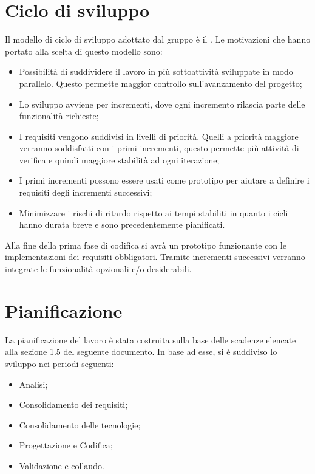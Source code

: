 \documentclass[../PianodiProgetto.tex]{subfiles}
\begin{document}
	
	\chapter{Ciclo di sviluppo}
	
	Il modello di ciclo di sviluppo adottato dal gruppo è il . Le motivazioni che hanno portato alla scelta di questo modello sono:
	\begin{itemize}
		\item Possibilità di suddividere il lavoro in più sottoattività sviluppate in modo parallelo. Questo permette maggior controllo sull’avanzamento del progetto;
		\item Lo sviluppo avviene per incrementi, dove ogni incremento rilascia parte delle funzionalità richieste;
		\item I requisiti vengono suddivisi in livelli di priorità. Quelli a priorità maggiore verranno soddisfatti con i primi incrementi, questo permette più attività di verifica e quindi maggiore stabilità ad ogni iterazione;
		\item I primi incrementi possono essere usati come prototipo per aiutare a definire i requisiti degli incrementi successivi;
		\item Minimizzare i rischi di ritardo rispetto ai tempi stabiliti in quanto i cicli hanno durata breve e sono precedentemente pianificati.
	\end{itemize}
	Alla fine della prima fase di codifica si avrà un prototipo funzionante con le implementazioni dei requisiti obbligatori. Tramite incrementi successivi verranno integrate le funzionalità opzionali e/o desiderabili.
	
	\chapter{Pianificazione}
	
	La pianificazione del lavoro è stata costruita sulla base delle scadenze elencate alla sezione 1.5 del seguente documento. In base ad esse, si è suddiviso lo sviluppo nei periodi seguenti:
	\begin{itemize}
		\item Analisi;
		\item Consolidamento dei requisiti;
		\item Consolidamento delle tecnologie;
		\item Progettazione e Codifica;
		\item Validazione e collaudo.
	\end{itemize}
	\newpage
	
\end{document}

